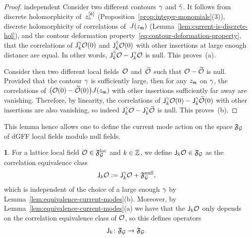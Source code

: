 \documentclass[12pt,oneside,english]{amsart}
\numberwithin{equation}{section}
\numberwithin{figure}{section}
\theoremstyle{plain}
\theoremstyle{plain}
\theoremstyle{plain}
\theoremstyle{plain}
\theoremstyle{remark}
\theoremstyle{definition}
\newtheorem{defn}[thm]{\protect\definitionname}
\theoremstyle{plain}
\theoremstyle{plain}
\numberwithin{thm}{section}
\newcommand{\kallemod}[1]{{\color{kallecol} {#1}}}
\providecommand{\definitionname}{Definition}
\providecommand{\definitionname}{Definition}
\providecommand{\definitionname}{Definition}
\providecommand{\definitionname}{Definition}
\begin{document}
\begin{proof}
independent 
% 
Consider two different contours $\gamma$ and $\tilde{\gamma}$.
It follows from discrete holomorphicity of~${z_{\diamond}^{[{k}]}}$
(Proposition~\ref{prop:integer-monomials}(3)), discrete holomorphicity of 
correlations of~${J} (z_{\mathfrak{m}})$
(Lemma~\ref{lem:current-is-discrete-hol}), and
the contour deformation
property~\eqref{eq:contour-deformation-property}, that the correlations of
$\mathsf{J}_{{k}}^{\gamma} {\mathcal{O}}(0)$ and
$\mathsf{J}_{{k}}^{\tilde{\gamma}} {\mathcal{O}}(0)$ with other insertions at large enough 
distance are equal. In other words,
$\mathsf{J}_{{k}}^{\tilde{\gamma}} {\mathcal{O}} - \mathsf{J}_{{k}}^{\gamma} {\mathcal{O}}$
is null. This proves~(a).

Consider then two different local fields~${\mathcal{O}}$ and~$\widetilde{{\mathcal{O}}}$
such that ${\mathcal{O}} - \widetilde{{\mathcal{O}}}$ is null. Provided that the contour 
$\gamma$ is sufficiently large, then for any $z_{\mathfrak{m}}$ on
$\gamma$, the correlations of
$\big( {\mathcal{O}}(0) - \widetilde{{\mathcal{O}}}(0) \big) {J} (z_{\mathfrak{m}})$
with other insertions sufficiently far away are vanishing. Therefore, by 
linearity, the correlations
of $\mathsf{J}_{{k}}^{\gamma} {\mathcal{O}}(0) -
\mathsf{J}_{{k}}^{\gamma} \widetilde{{\mathcal{O}}}(0)$ with other insertions are 
also vanishing, so indeed
$\mathsf{J}_{{k}}^{\gamma} {\mathcal{O}} - \mathsf{J}_{{k}}^{\gamma} 
\widetilde{{\mathcal{O}}}$
is null. This proves~(b).
\end{proof}

This lemma hence allows one to define the current mode action on the space
$\mathfrak{F}_{\mathcal{G}}$ of dGFF local fields modulo null fields. 
\begin{defn}
\label{def:current-modes-gff}
For a lattice local field ${\mathcal{O}} \in \mathfrak{F}^\mathrm{loc}_{\mathcal{G}}$
and $k \in \mathbb{Z} $, we define
$\mathsf{J}_{{k}}{\mathcal{O}} \in \mathfrak{F}_{\mathcal{G}}$ as the correlation
equivalence class
\begin{align*}
\mathsf{J}_{{k}}{\mathcal{O}} :=
\mathsf{J}_{{k}}^{\gamma} {\mathcal{O}} + \mathfrak{F}^\mathrm{null}_{\mathcal{G}} ,
\end{align*}
which is independent of the choice of a large 
enough $\gamma$ by Lemma~\ref{lem:equivalence-current-modes}(b).
Moreover, by Lemma~\ref{lem:equivalence-current-modes}(a) we have that
the $\mathsf{J}_{{k}}{\mathcal{O}}$ only depends on the correlation equivalence class
of ${\mathcal{O}}$, so this defines operators
\[ \mathsf{J}_{{k}} \colon
\mathfrak{F}_{\mathcal{G}} \to \mathfrak{F}_{\mathcal{G}} . \]
\end{defn}
\end{document}

